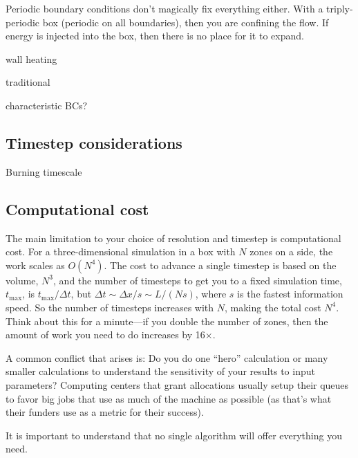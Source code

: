 Periodic boundary conditions don't magically fix everything either.  
With a triply-periodic box (periodic on all boundaries), then you 
are confining the flow.  If energy is injected into the box, then
there is no place for it to expand.  


wall heating


traditional


characteristic BCs?





\subsection{Timestep considerations}

Burning timescale



\subsection{Computational cost}

The main limitation to your choice of resolution and timestep is
computational cost.  For a three-dimensional simulation in a box with
$N$ zones on a side, the work scales as $O(N^4)$.  The cost to advance
a single timestep is based on the volume, $N^3$, and the number of
timesteps to get you to a fixed simulation time, $t_\mathrm{max}$, is
$t_\mathrm{max}/\Delta t$, but $\Delta t \sim \Delta x / s \sim L/(N
s)$, where $s$ is the fastest information speed.  So the number 
of timesteps increases with $N$, making the total cost $N^4$.
Think about this for a minute---if you double the number of zones, then
the amount of work you need to do increases by 16$\times$.

A common conflict that arises is: Do you do one ``hero'' calculation
or many smaller calculations to understand the sensitivity of your
results to input parameters?  Computing centers that grant allocations
usually setup their queues to favor big jobs that use as much of the
machine as possible (as that's what their funders use as a metric for
their success).


It is important to understand that no single algorithm will offer everything
you need.
